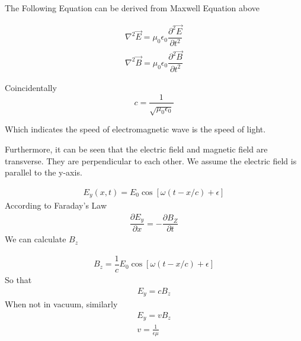 \documentclass{article}
\begin{document}
The Following Equation can be derived from Maxwell Equation above

\begin{equation}
  \begin{aligned}
    \nabla^{2} \vec{E} = \mu_{0} \epsilon_{0} \dfrac{\partial^{2} \vec{E}}{\partial t^{2}}\\
    \nabla^{2} \vec{B} = \mu_{0} \epsilon_{0} \dfrac{\partial^{2} \vec{B}}{\partial t^{2}} 
  \end{aligned}
\end{equation}

Coincidentally
\begin{equation}
  c = \dfrac{1}{\sqrt{\mu_{0} \epsilon_{0}}} 
\end{equation}

Which indicates the speed of electromagnetic wave is the speed of light.

Furthermore, it can be seen that the electric field and magnetic field are transverse. They are perpendicular to each other. We assume the electric field is parallel to the y-axis.

\begin{equation}
  \begin{aligned}
    E_{y} (x,t) = E_{0} \cos \left[ \omega \left( t - x/c  \right) + \epsilon \right]
  \end{aligned}
\end{equation}
According to Faraday's Law
\begin{equation}
  \begin{aligned}
    \dfrac{\partial E_{y}}{\partial x} = - \dfrac{\partial B_{Z}}{\partial t}  
  \end{aligned}
\end{equation}
We can calculate $B_{z}$

\begin{equation}
  \begin{aligned}
    B_z = \dfrac{1}{c} E_{0} \cos \left[ \omega \left( t - x/c  \right) + \epsilon \right]
  \end{aligned}
\end{equation}
So that
\begin{equation}
  \begin{aligned}
    E_y = c B_z
  \end{aligned}
\end{equation}
When not in vacuum, similarly
\begin{equation}
  \begin{aligned}
    E_y=vB_z \\
    v=\frac{1}{\epsilon\mu}
  \end{aligned}
\end{equation}
\end{document}

